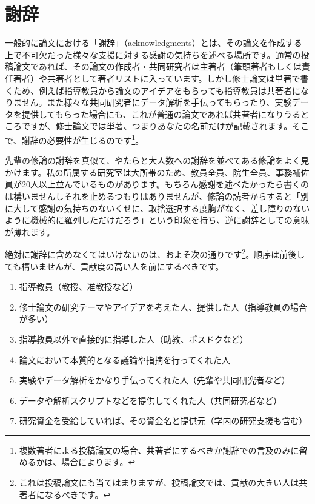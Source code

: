 \chapter*{謝辞}%

一般的に論文における「謝辞」（acknowledgments）とは、その論文を作成する上で不可欠だった様々な支援に対する感謝の気持ちを述べる場所です。通常の投稿論文であれば、その論文の作成者・共同研究者は主著者（筆頭著者もしくは責任著者）や共著者として著者リストに入っています。しかし修士論文は単著で書くため、例えば指導教員から論文のアイデアをもらっても指導教員は共著者になりません。また様々な共同研究者にデータ解析を手伝ってもらったり、実験データを提供してもらった場合にも、これが普通の論文であれば共著者になりうるところですが、修士論文では単著、つまりあなたの名前だけが記載されます。そこで、謝辞の必要性が生じるのです\footnote{複数著者による投稿論文の場合、共著者にするべきか謝辞での言及のみに留めるかは、場合によります。}。

先輩の修論の謝辞を真似て、やたらと大人数への謝辞を並べてある修論をよく見かけます。私の所属する研究室は大所帯のため、教員全員、院生全員、事務補佐員が20人以上並んでいるものがあります。もちろん感謝を述べたかったら書くのは構いませんしそれを止めるつもりはありませんが、修論の読者からすると「別に大して感謝の気持ちのないくせに、取捨選択する度胸がなく、差し障りのないように機械的に羅列しただけだろう」という印象を持ち、逆に謝辞としての意味が薄れます。

絶対に謝辞に含めなくてはいけないのは、およそ次の通りです\footnote{これは投稿論文にも当てはまりますが、投稿論文では、貢献の大きい人は共著者になるべきです。}。順序は前後しても構いませんが、貢献度の高い人を前にするべきです。
\begin{enumerate}
\item 指導教員（教授、准教授など）
\item 修士論文の研究テーマやアイデアを考えた人、提供した人（指導教員の場合が多い）
\item 指導教員以外で直接的に指導した人（助教、ポスドクなど）
\item 論文において本質的となる議論や指摘を行ってくれた人
\item 実験やデータ解析をかなり手伝ってくれた人（先輩や共同研究者など）
\item データや解析スクリプトなどを提供してくれた人（共同研究者など）
\item 研究資金を受給していれば、その資金名と提供元（学内の研究支援も含む）
\end{enumerate}

